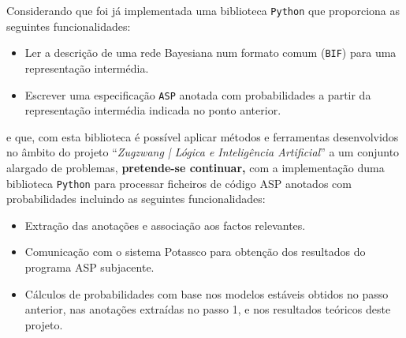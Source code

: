 \documentclass{oficio}
\begin{document}
\unidade{\textsc{\DI}}


Considerando que foi já implementada uma biblioteca \texttt{Python} que proporciona as seguintes funcionalidades:
%
\begin{itemize}
    \item Ler a descrição de uma rede Bayesiana num formato comum (\texttt{BIF}) para uma representação intermédia.
    \item Escrever uma especificação \texttt{ASP} anotada com probabilidades a partir da representação intermédia indicada no ponto anterior.
\end{itemize}
%
e que, com esta biblioteca é possível aplicar métodos e ferramentas desenvolvidos no âmbito do projeto ``\emph{Zugzwang | Lógica e Inteligência Artificial}'' a um conjunto alargado de problemas, \textbf{pretende-se continuar,} com a implementação duma biblioteca \texttt{Python} para processar ficheiros de código ASP anotados com probabilidades incluindo as seguintes funcionalidades:

\begin{itemize}

    \item Extração das anotações e associação aos factos relevantes.
    \item Comunicação com o sistema Potassco para obtenção dos resultados do programa ASP subjacente.
    \item Cálculos de probabilidades com base nos modelos estáveis obtidos no passo anterior, nas anotações extraídas no passo 1, e nos resultados teóricos deste projeto.    
\end{itemize}

\end{document}
